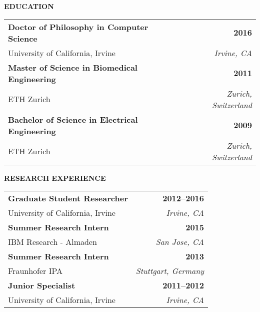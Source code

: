 \curriculumvitae
{

\textbf{EDUCATION}
  
  \begin{tabular*}{1\textwidth}{@{\extracolsep{\fill}}lr}
    \textbf{Doctor of Philosophy in Computer Science} & \textbf{2016} \\
    \vspace{6pt}
    University of California, Irvine & \emph{Irvine, CA} \\
    \textbf{Master of Science in Biomedical Engineering} & \textbf{2011} \\
    \vspace{6pt}
    ETH Zurich & \emph{Zurich, Switzerland} \\
    \textbf{Bachelor of Science in Electrical Engineering} & \textbf{2009} \\
    \vspace{6pt}
    ETH Zurich & \emph{Zurich, Switzerland} \\
  \end{tabular*}

\pagebreak

\vspace{12pt}
\textbf{RESEARCH EXPERIENCE}

  \begin{tabular*}{1\textwidth}{@{\extracolsep{\fill}}lr}
    \textbf{Graduate Student Researcher} & \textbf{2012--2016} \\
    \vspace{6pt}
    University of California, Irvine & \emph{Irvine, CA} \\
    \textbf{Summer Research Intern} & \textbf{2015} \\
    \vspace{6pt}
    IBM Research - Almaden & \emph{San Jose, CA} \\
    \textbf{Summer Research Intern} & \textbf{2013} \\
    \vspace{6pt}
    Fraunhofer IPA & \emph{Stuttgart, Germany} \\
    \textbf{Junior Specialist} & \textbf{2011--2012} \\
    \vspace{6pt}
    University of California, Irvine & \emph{Irvine, CA} \\
  \end{tabular*}

}
